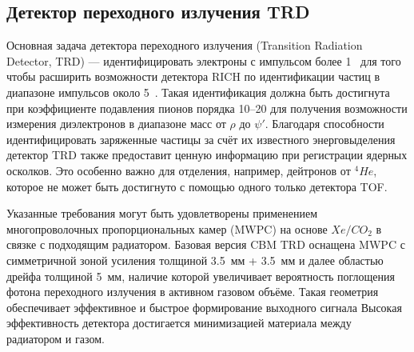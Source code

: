\subsection{Детектор переходного излучения TRD}\label{sec:secTRD}


Основная задача детектора переходного излучения (Transition Radiation Detector, TRD) --- идентифицировать электроны с импульсом более 1~\GeVoverC{} для того чтобы расширить возможности детектора RICH по идентификации частиц в диапазоне импульсов около 5~\GeVoverC{}.
Такая идентификация должна быть достигнута при коэффициенте подавления пионов порядка 10--20 для получения возможности измерения диэлектронов в диапазоне масс от $\rho$ до $\psi'$.
Благодаря способности идентифицировать заряженные частицы за счёт их известного энерговыделения детектор TRD также предоставит ценную информацию при регистрации ядерных осколков.
Это особенно важно для отделения, например, дейтронов от $ ^{4}He $, которое не может быть достигнуто с помощью одного только детектора TOF.


Указанные требования могут быть удовлетворены применением многопроволочных пропорциональных камер (MWPC) на основе $ Xe/CO_{2} $ в связке с подходящим радиатором. Базовая версия CBM TRD оснащена MWPC с симметричной зоной усиления толщиной 3.5~мм + 3.5~мм и далее областью дрейфа толщиной 5~мм, наличие которой увеличивает вероятность поглощения фотона переходного излучения в активном газовом объёме. Такая геометрия обеспечивает эффективное и быстрое формирование выходного сигнала
Высокая эффективность детектора достигается минимизацией материала между радиатором и газом.

